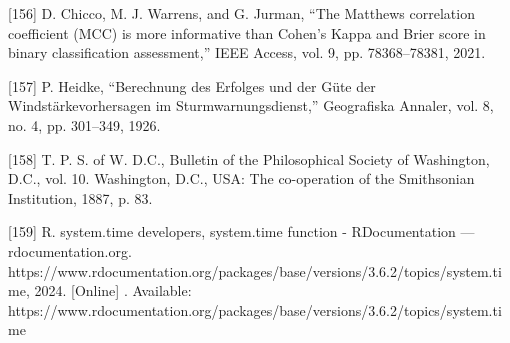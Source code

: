 \documentclass[sn-mathphys-num]{sn-jnl}%
\begin{document}
[156] D. Chicco, M. J. Warrens, and G. Jurman, “The Matthews correlation coefficient (MCC) is more informative than Cohen’s Kappa and Brier score in binary classification assessment,” IEEE Access, vol. 9, pp. 78368–78381, 2021.

[157] P. Heidke, “Berechnung des Erfolges und der Güte der Windstärkevorhersagen im Sturmwarnungsdienst,” Geografiska Annaler, vol. 8, no. 4, pp. 301–349, 1926.

[158] T. P. S. of W. D.C., Bulletin of the Philosophical Society of Washington, D.C., vol. 10. Washington, D.C., USA: The co-operation of the Smithsonian Institution, 1887, p. 83.

[159] R. system.time developers, system.time function - RDocumentation — rdocumentation.org. https://www.rdocumentation.org/packages/base/versions/3.6.2/topics/system.time, 2024. [Online] . Available: https://www.rdocumentation.org/packages/base/versions/3.6.2/topics/system.time
\end{document}
